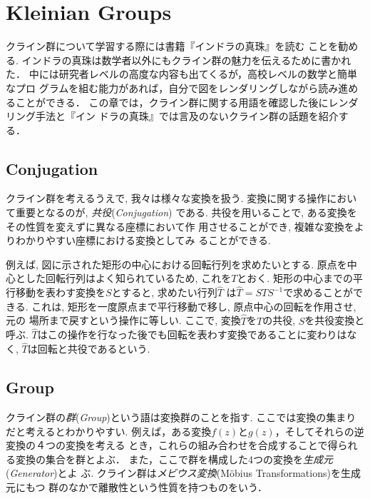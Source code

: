 
\section{Kleinian Groups}

クライン群について学習する際には書籍『インドラの真珠』\cite{indra}を読む
ことを勧める.
インドラの真珠は数学者以外にもクライン群の魅力を伝えるために書かれた．
中には研究者レベルの高度な内容も出てくるが，高校レベルの数学と簡単なプロ
グラムを組む能力があれば，自分で図をレンダリングしながら読み進めることができる．
この章では，クライン群に関する用語を確認した後にレンダリング手法と『イン
ドラの真珠』では言及のないクライン群の話題を紹介する．

\subsection{Conjugation}

クライン群を考えるうえで, 我々は様々な変換を扱う.
変換に関する操作において重要となるのが, \emph{共役}(\textit{Conjugation})
である.
共役を用いることで, ある変換をその性質を変えずに異なる座標において作
用させることができ, 複雑な変換をよりわかりやすい座標における変換としてみ
ることができる.

例えば, 図に示された矩形の中心における回転行列を求めたいとする.
原点を中心とした回転行列はよく知られているため, これを$T$とおく.
矩形の中心までの平行移動を表わす変換を$S$とすると, 求めたい行列$\hat{T}$
は$\hat{T} = STS^{-1}$で求めることができる.
これは, 矩形を一度原点まで平行移動で移し, 原点中心の回転を作用させ, 元の
場所まで戻すという操作に等しい.
ここで, 変換$\hat{T}$を$T$の共役, $S$を共役変換と呼ぶ.
$\hat{T}$はこの操作を行なった後でも回転を表わす変換であることに変わりはなく,
$\hat{T}$は回転と共役であるという.

\subsection{Group}

クライン群の\emph{群}(\textit{Group})という語は変換群のことを指す.
ここでは変換の集まりだと考えるとわかりやすい.
例えば，ある変換$f(z)$と$g(z)$，そしてそれらの逆変換の４つの変換を考える
とき，これらの組み合わせを合成することで得られる変換の集合を群とよぶ．
また，ここで群を構成した4つの変換を\emph{生成元}(\textit{Generator})とよ
ぶ.
クライン群は\emph{メビウス変換}(M\"obius Transformations)を生成元にもつ
群のなかで離散性という性質を持つものをいう．

